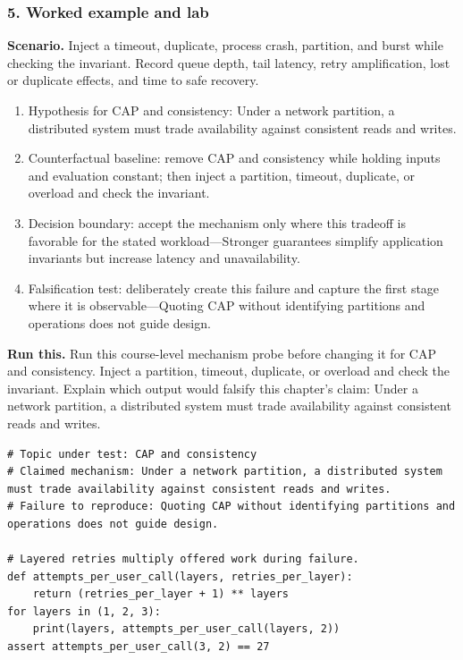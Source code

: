 \subsubsection*{5. Worked example and lab}
\textbf{Scenario.} Inject a timeout, duplicate, process crash, partition, and burst while checking the invariant. Record queue depth, tail latency, retry amplification, lost or duplicate effects, and time to safe recovery.
\begin{enumerate}
\item Hypothesis for CAP and consistency: Under a network partition, a distributed system must trade availability against consistent reads and writes.
\item Counterfactual baseline: remove CAP and consistency while holding inputs and evaluation constant; then inject a partition, timeout, duplicate, or overload and check the invariant.
\item Decision boundary: accept the mechanism only where this tradeoff is favorable for the stated workload—Stronger guarantees simplify application invariants but increase latency and unavailability.
\item Falsification test: deliberately create this failure and capture the first stage where it is observable—Quoting CAP without identifying partitions and operations does not guide design.
\end{enumerate}
\textbf{Run this.} Run this course-level mechanism probe before changing it for CAP and consistency. Inject a partition, timeout, duplicate, or overload and check the invariant. Explain which output would falsify this chapter's claim: Under a network partition, a distributed system must trade availability against consistent reads and writes.
\begin{Verbatim}[fontsize=\scriptsize]
# Topic under test: CAP and consistency
# Claimed mechanism: Under a network partition, a distributed system must trade availability against consistent reads and writes.
# Failure to reproduce: Quoting CAP without identifying partitions and operations does not guide design.

# Layered retries multiply offered work during failure.
def attempts_per_user_call(layers, retries_per_layer):
    return (retries_per_layer + 1) ** layers
for layers in (1, 2, 3):
    print(layers, attempts_per_user_call(layers, 2))
assert attempts_per_user_call(3, 2) == 27
\end{Verbatim}
